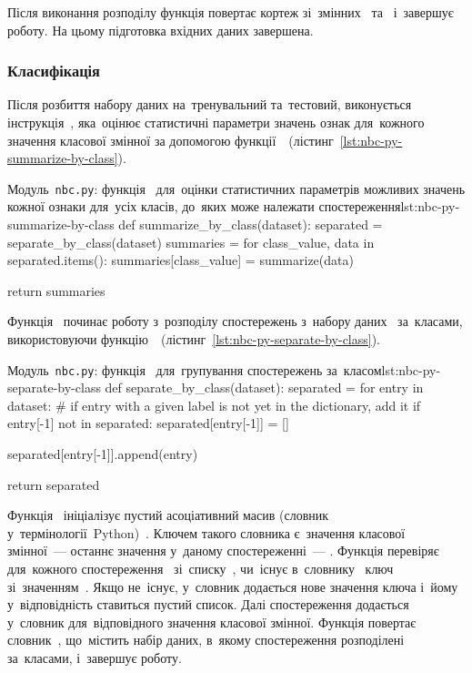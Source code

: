 \documentclass[
	a4paper,
	oneside,
	DIV = 12,
	fontsize = 13pt,
	headings = normal,
	numbers = endperiod,
	bibliography = totoc, %
]{scrartcl}
\theoremstyle{mythm}
\newcommand{\filename}[1]{\texttt{#1}}
\begin{document}
					Після виконання розподілу функція повертає кортеж зі~змінних~ та~ і~завершує роботу. На цьому підготовка вхідних даних завершена.

				\subsubsection{Класифікація}

					Після розбиття набору даних на~тренувальний та~тестовий, виконується інструкція~, яка~оцінює статистичні параметри значень ознак для~кожного значення класової змінної за допомогою функції~~(лістинг~\ref{lst:nbc-py-summarize-by-class}).

					\begin{listingpython}{Модуль~\filename{nbc.py}: функція~ для~оцінки статистичних параметрів можливих значень кожної ознаки для~усіх класів, до~яких може належати спостереження}{lst:nbc-py-summarize-by-class}
	def summarize_by_class(dataset):
			separated = separate_by_class(dataset)
			summaries = {}
			for class_value, data in separated.items():
					summaries[class_value] = summarize(data)

			return summaries
						\end{listingpython}

						Функція~ починає роботу з~розподілу спостережень з~набору даних~ за~класами, використовуючи функцію~~(лістинг~\ref{lst:nbc-py-separate-by-class}).

					\begin{listingpython}{Модуль~\filename{nbc.py}: функція~ для~групування спостережень за~класом}{lst:nbc-py-separate-by-class}
	def separate_by_class(dataset):
			separated = {}
			for entry in dataset:
					# if entry with a given label is not yet in the dictionary, add it
					if entry[-1] not in separated:
							separated[entry[-1]] = []

					separated[entry[-1]].append(entry)

			return separated
						\end{listingpython}

						Функція~ ініціалізує пустий асоціативний масив (словник у~термінології~\textenglish{Python})~. Ключем такого словника є~значення класової змінної~— останнє значення у~даному спостереженні~— . Функція перевіряє для~кожного спостереження~ зі~списку~, чи~існує в~словнику~ ключ зі~значенням~. Якщо не~існує, у~словник додається нове значення ключа і~йому у~відповідність ставиться пустий список. Далі спостереження додається у~словник для~відповідного значення класової змінної. Функція повертає словник~, що~містить набір даних, в~якому спостереження розподілені за~класами, і~завершує роботу. 
\end{document}
